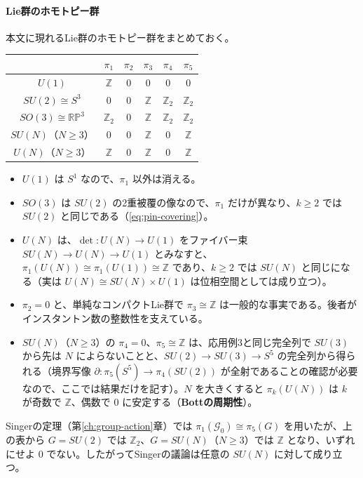 \documentclass[uplatex, dvipdfmx, book]{jsbook}
\begin{document}
\paragraph{Lie群のホモトピー群}
本文に現れるLie群のホモトピー群をまとめておく。
\begin{center}
\begin{tabular}{c|ccccc}
    \hline
    & $\pi_1$ & $\pi_2$ & $\pi_3$ & $\pi_4$ & $\pi_5$ \\
    \hline
    $U(1)$ & $\mathbb{Z}$ & $0$ & $0$ & $0$ & $0$ \\
    $SU(2) \cong S^3$ & $0$ & $0$ & $\mathbb{Z}$ & $\mathbb{Z}_2$ & $\mathbb{Z}_2$ \\
    $SO(3) \cong \mathbb{RP}^3$ & $\mathbb{Z}_2$ & $0$ & $\mathbb{Z}$ & $\mathbb{Z}_2$ & $\mathbb{Z}_2$ \\
    $SU(N)$（$N \ge 3$） & $0$ & $0$ & $\mathbb{Z}$ & $0$ & $\mathbb{Z}$ \\
    $U(N)$（$N \ge 3$） & $\mathbb{Z}$ & $0$ & $\mathbb{Z}$ & $0$ & $\mathbb{Z}$ \\
    \hline
\end{tabular}
\end{center}
\begin{itemize}
    \item $U(1)$ は $S^1$ なので、$\pi_1$ 以外は消える。
    \item $SO(3)$ は $SU(2)$ の2重被覆の像なので、$\pi_1$ だけが異なり、$k \ge 2$ では $SU(2)$ と同じである（\eqref{eq:pin-covering}）。
    \item $U(N)$ は、$\det: U(N) \to U(1)$ をファイバー束 $SU(N) \to U(N) \to U(1)$ とみなすと、$\pi_1(U(N)) \cong \pi_1(U(1)) \cong \mathbb{Z}$ であり、$k \ge 2$ では $SU(N)$ と同じになる（実は $U(N) \cong SU(N) \times U(1)$ は位相空間としては成り立つ）。
    \item $\pi_2 = 0$ と、単純なコンパクトLie群で $\pi_3 \cong \mathbb{Z}$ は一般的な事実である。後者がインスタントン数の整数性を支えている。
    \item $SU(N)$（$N \ge 3$）の $\pi_4 = 0$、$\pi_5 \cong \mathbb{Z}$ は、応用例3と同じ完全列で $SU(3)$ から先は $N$ によらないことと、$SU(2) \to SU(3) \to S^5$ の完全列から得られる（境界写像 $\partial: \pi_5(S^5) \to \pi_4(SU(2))$ が全射であることの確認が必要なので、ここでは結果だけを記す）。$N$ を大きくすると $\pi_k(U(N))$ は $k$ が奇数で $\mathbb{Z}$、偶数で $0$ に安定する（\textbf{Bottの周期性}）。
\end{itemize}
Singerの定理（第\ref{ch:group-action}章）では $\pi_1(\mathcal{G}_0) \cong \pi_5(G)$ を用いたが、上の表から $G = SU(2)$ では $\mathbb{Z}_2$、$G = SU(N)$（$N \ge 3$）では $\mathbb{Z}$ となり、いずれにせよ $0$ でない。したがってSingerの議論は任意の $SU(N)$ に対して成り立つ。
\end{document}
